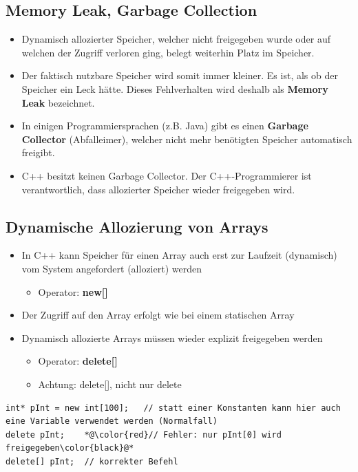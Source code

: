 \subsection{Memory Leak, Garbage Collection}
\label{sec:Memory Leak, Garbage Collection}
\begin{itemize}
	\item Dynamisch allozierter Speicher, welcher nicht freigegeben wurde oder auf welchen der Zugriff verloren ging, belegt weiterhin Platz im Speicher.
	\item Der faktisch nutzbare Speicher wird somit immer kleiner. Es ist, als ob der Speicher ein Leck hätte. Dieses Fehlverhalten wird deshalb als \textbf{Memory Leak} bezeichnet.
	\item In einigen Programmiersprachen (z.B. Java) gibt es einen \textbf{Garbage Collector} (Abfalleimer), welcher nicht mehr benötigten Speicher automatisch freigibt.
	\item C++ besitzt keinen Garbage Collector. Der C++-Programmierer ist verantwortlich, dass allozierter Speicher wieder freigegeben wird.
\end{itemize}

\subsection{Dynamische Allozierung von Arrays}
\label{sec:Dynamische Allozierung von Arrays}
\begin{itemize}
	\item In C++ kann Speicher für einen Array auch erst zur Laufzeit (dynamisch) vom System angefordert (alloziert) werden
	\begin{itemize}
		\item Operator: \textbf{new[]}
	\end{itemize}
	\item Der Zugriff auf den Array erfolgt wie bei einem statischen Array
	\item Dynamisch allozierte Arrays müssen wieder explizit freigegeben werden
	\begin{itemize}
		\item Operator: \textbf{delete[]}
		\item \color{red}Achtung: delete[], nicht nur delete\color{black}
	\end{itemize}
\end{itemize}
\noindent
\begin{minipage}{\linewidth}
\begin{lstlisting}
int* pInt = new int[100];	// statt einer Konstanten kann hier auch eine Variable verwendet werden (Normalfall)
delete pInt;	*@\color{red}// Fehler: nur pInt[0] wird freigegeben\color{black}@*
delete[] pInt;	// korrekter Befehl
\end{lstlisting}
\end{minipage} 

